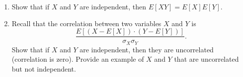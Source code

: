 \begin{enumerate}[label=(\alph*)]
    \item Show that if $X$ and $Y$ are independent, then $E[XY] = E[X]E[Y]$.
  \item Recall that the correlation between two variables $X$ and $Y$ is $$\frac{E[(X - E[X])\cdot(Y-E[Y])]}{\sigma_X \sigma_{Y}}.$$
    Show that if $X$ and $Y$ are independent, then they are uncorrelated (correlation is zero). Provide an example of $X$ and $Y$ that are uncorrelated but not independent.
\end{enumerate}

\smallspace

  

